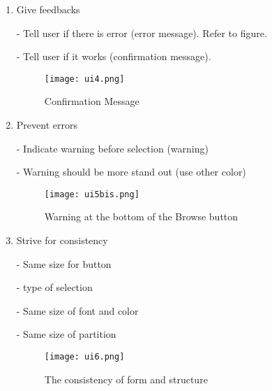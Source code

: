 \begin{enumerate}
\item Give feedbacks
	\par - Tell user if there is error (error message). Refer to figure.
	\par - Tell user if it works (confirmation message). 
\begin{figure}[ht]
	\centering
			\texttt{[image: ui4.png]}
	\caption{Confirmation Message}
	\label{fig: confirm }
\end{figure}

\item Prevent errors
	\par - Indicate warning before selection (warning)
	\par - Warning should be more stand out (use other color)
\begin{figure}[ht]
	\centering
			\texttt{[image: ui5bis.png]} 
	\caption{Warning at the bottom of the Browse button}
	\label{fig: warning }
\end{figure}

\item Strive for consistency
	\par - Same size for button
	\par - type of selection
	\par - Same size of font and color
	\par - Same size of partition
	
\begin{figure}[ht]
	\centering
			\texttt{[image: ui6.png]} 
	\caption{The consistency of form and structure}
	\label{fig: form }
\end{figure}
\end{enumerate}


\newpage    
\nocite{*}
\printbibliography



